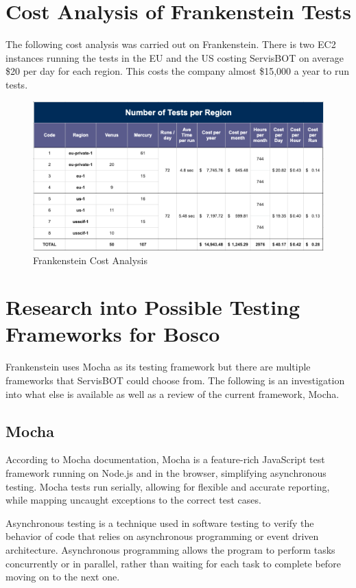 \documentclass[12pt,a4paper,titlepage]{report}
\begin{document}
\section{Cost Analysis of Frankenstein Tests}

The following cost analysis was carried out on Frankenstein. There is two EC2 instances running the tests in the EU and the US costing ServisBOT on average \$20 per day for each region. This costs the company almost \$15,000 a year to run tests.

\begin{figure}[ht]
 \centering
 \includegraphics[width=\textwidth,height=\textheight,keepaspectratio]{./diagrams/frank_cost_analysis.png}
 \caption{Frankenstein Cost Analysis}
\end{figure}

\section{Research into Possible Testing Frameworks for Bosco}

Frankenstein uses Mocha as its testing framework but there are multiple frameworks that ServisBOT could choose from. The following is an investigation into what else is available as well as a review of the current framework, Mocha.
\subsection{Mocha}

According to Mocha documentation, Mocha is a feature-rich JavaScript test framework running on Node.js and in the browser, simplifying asynchronous
testing. Mocha tests run serially, allowing for flexible and accurate reporting, while mapping uncaught
exceptions to the correct test cases. \autocite{Mocha}

Asynchronous testing is a technique used in software testing to verify the behavior of code that relies on asynchronous programming or event driven architecture. Asynchronous programming allows the program to perform tasks concurrently or in parallel, rather than waiting for each task to complete before moving on to the next one. 
\end{document}
